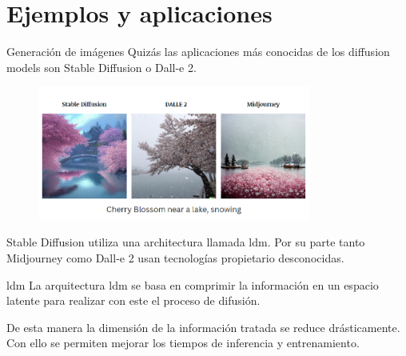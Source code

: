 \section{Ejemplos y aplicaciones}

\begin{frame}{Generación de imágenes}
Quizás las aplicaciones más conocidas de los \alert{diffusion models} son \alert{Stable Diffusion} o \alert{Dall-e 2}.

\begin{figure}
    \centering
    \includegraphics[width=0.8\textwidth]{Slides/figures/Diffusion_Models/Stable_Diffusion_Dalle.png}
    \caption{\cite{SD_vs_DE_vs_MJ}}
\end{figure}

Stable Diffusion utiliza una architectura llamada \alert{\gls{ldm}}. Por su parte tanto Midjourney como Dall-e 2 usan tecnologías propietario desconocidas.
\end{frame}

\begin{frame}{\acrlong{ldm}}
La arquitectura \gls{ldm} \cite{rombach2022high} se basa en \alert{comprimir la información} en un espacio latente para realizar con este el proceso de difusión.

De esta manera la \alert{dimensión} de la información tratada se reduce drásticamente. Con ello se permiten mejorar los tiempos de inferencia y entrenamiento.
\end{frame}

